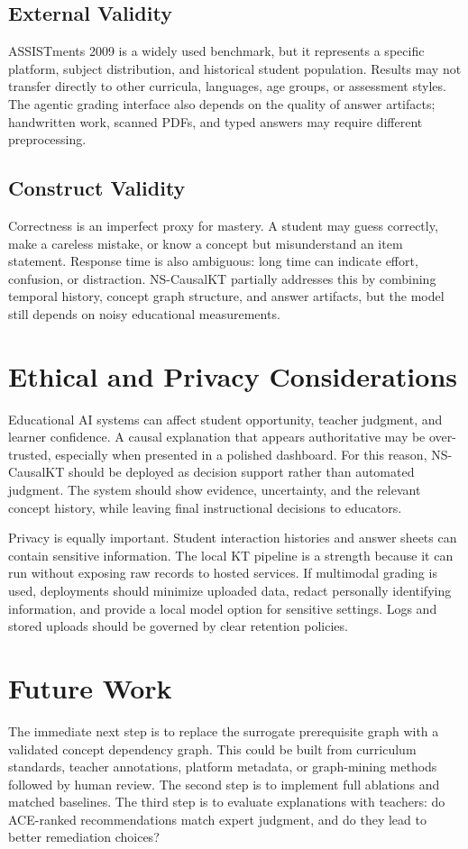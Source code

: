 \documentclass[conference]{IEEEtran}
\begin{document}
\subsection{External Validity}
ASSISTments 2009 is a widely used benchmark, but it represents a specific platform, subject distribution, and historical student population. Results may not transfer directly to other curricula, languages, age groups, or assessment styles. The agentic grading interface also depends on the quality of answer artifacts; handwritten work, scanned PDFs, and typed answers may require different preprocessing.

\subsection{Construct Validity}
Correctness is an imperfect proxy for mastery. A student may guess correctly, make a careless mistake, or know a concept but misunderstand an item statement. Response time is also ambiguous: long time can indicate effort, confusion, or distraction. NS-CausalKT partially addresses this by combining temporal history, concept graph structure, and answer artifacts, but the model still depends on noisy educational measurements.

\section{Ethical and Privacy Considerations}
Educational AI systems can affect student opportunity, teacher judgment, and learner confidence. A causal explanation that appears authoritative may be over-trusted, especially when presented in a polished dashboard. For this reason, NS-CausalKT should be deployed as decision support rather than automated judgment. The system should show evidence, uncertainty, and the relevant concept history, while leaving final instructional decisions to educators.

Privacy is equally important. Student interaction histories and answer sheets can contain sensitive information. The local KT pipeline is a strength because it can run without exposing raw records to hosted services. If multimodal grading is used, deployments should minimize uploaded data, redact personally identifying information, and provide a local model option for sensitive settings. Logs and stored uploads should be governed by clear retention policies.

\section{Future Work}
The immediate next step is to replace the surrogate prerequisite graph with a validated concept dependency graph. This could be built from curriculum standards, teacher annotations, platform metadata, or graph-mining methods followed by human review. The second step is to implement full ablations and matched baselines. The third step is to evaluate explanations with teachers: do ACE-ranked recommendations match expert judgment, and do they lead to better remediation choices?
\end{document}
